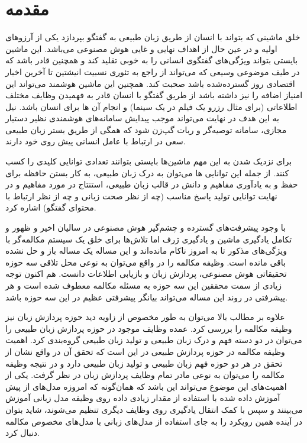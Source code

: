 \chapter{مقدمه}\label{Chap:Chap1}
\minitoc

خلق ماشینی که بتواند با انسان از طریق زبان طبیعی به گفتگو بپردازد یکی از آرزو‌های اولیه و در عین حال از اهداف نهایی و غایی هوش مصنوعی می‌باشد.
این ماشین بایستی بتواند ویژگی‌های گفتگوی انسانی را به خوبی تقلید کند و همچنین قادر باشد که در طیف موضوعی وسیعی که می‌تواند از راجع به تئوری نسبیت انیشتین تا آخرین اخبار اقتصادی روز گسترده‌شده باشد صحبت کند.
همچنین این ماشین هوشمند می‌تواند این امنیاز اضافه را نیز داشته باشد از طریق گفتگو با انسان قادر به فهمیدن وظایف مختلف اطلاعاتی (برای مثال رزرو یک فیلم در یک سینما) و انجام آن ها برای انسان باشد.
نیل به این هدف در نهایت می‌تواند موجب پیدایش سامانه‌های هوشمندی نظیر
دستیار مجازی، سامانه توصیه‌گر و ربات گپ‌زن شود که همگی از طریق 
بستر زبان طبیعی سعی در ارتباط با عامل انسانی پیش‌ روی خود دارند.

برای نزدیک شدن به این مهم ماشین‌ها بایستی بتوانند تعدادی توانایی کلیدی را کسب کنند. از جمله این توانایی ها می‌توان به درک زبان طبیعی، به کار بستن حافظه برای حفظ و به یادآوری مفاهیم و دانش در قالب زبان طبیعی،‌ استنتاج در مورد مفاهیم و در نهایت توانایی تولید پاسخ مناسب (چه از نظر صحت زبانی و چه از نظر ارتباط با محتوای گفتگو) اشاره کرد.

با وجود پیشرفت‌های گسترده و چشم‌گیر هوش مصنوعی در سالیان اخیر و ظهور و تکامل یادگیری ماشین و یادگیری ژرف اما تلاش‌ها برای خلق یک سیستم مکالمه‌گر با ویژگی‌های مذکور تا به امروز ناکام مانده‌اند و این مساله یک مساله باز و حل نشده باقی مانده است.
وظیفه مکالمه را در واقع می‌توان به نوعی محل تلاقی سه حوزه تحقیقاتی
هوش مصنوعی، پردازش زبان و بازیابی اطلاعات دانست.
هم اکنون توجه زیادی از سمت محققین این سه حوزه به مسئله مکالمه معطوف شده است و هر پیشرفتی در روند این مساله می‌تواند بیانگر پیشرفتی عظیم در این سه حوزه باشد.

علاوه بر مطالب بالا می‌توان به طور مخصوص از زاویه دید حوزه پردازش زبان نیز وظیفه مکالمه را بررسی کرد. عمده وظایف موجود در حوزه پردازش زبان طبیعی را می‌توان در دو دسته فهم و درک زبان طبیعی و تولید زبان طبیعی گروه‌بندی کرد. اهمیت وظیفه مکالمه در حوزه پردازش طبیعی در این است که تحقق آن در واقع نشان از تحقق در هر دو حوزه فهم زبان طبیعی و تولید زبان طبیعی دارد و در نتیجه وظیفه مکالمه را می‌توان به نوعی مادر تمام وظایف پردازش زبان در نظر گرفت. یکی از اهمیت‌های این موضوع می‌تواند این باشد که همان‌گونه که امروزه مدل‌های از پیش آموزش داده شده با استفاده از مقدار زیادی داده روی وظیفه مدل زبانی آموزش می‌بینند و سپس با کمک انتقال یادگیری روی وظایف دیگری تنظیم می‌شوند، شاید بتوان در آینده همین رویکرد را به جای استفاده از مدل‌های زبانی با مدل‌های مخصوص مکالمه دنبال کرد.



